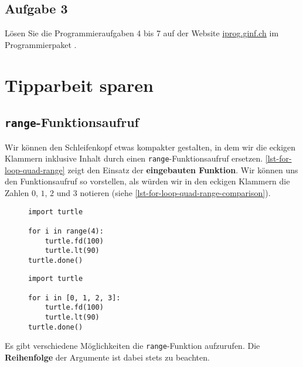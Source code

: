 \fillwithgrid{2in}

\subsection{Aufgabe 3}

Lösen Sie die Programmieraufgaben 4 bis 7 auf der Website \url{iprog.ginf.ch} im Programmierpaket .

\section{Tipparbeit sparen}

\subsection{\lstinline{range}-Funktionsaufruf}

Wir können den Schleifenkopf etwas kompakter gestalten, in dem wir die eckigen Klammern inklusive Inhalt durch einen \lstinline{range}-Funktionsaufruf ersetzen. \autoref{lst-for-loop-quad-range} zeigt den Einsatz der \textbf{eingebauten Funktion}. Wir können uns den Funktionsaufruf so vorstellen, als würden wir in den eckigen Klammern die Zahlen $0$, $1$, $2$ und $3$ notieren (siehe \autoref{lst-for-loop-quad-range-comparison}).

\begin{figure}[htb]
\centering
\begin{minipage}{0.45\textwidth}
\centering
	\begin{lstlisting}[caption={Erste Verbesserung.}, label={lst-for-loop-quad-range}]
import turtle

for i in range(4):
    turtle.fd(100)
    turtle.lt(90)
turtle.done()
\end{lstlisting}
\end{minipage}
\hfill
\begin{minipage}{0.45\textwidth}
\centering
\begin{lstlisting}[caption={Eingangsbeispiel}, label={lst-for-loop-quad-range-comparison}]
import turtle

for i in [0, 1, 2, 3]:
    turtle.fd(100)
    turtle.lt(90)
turtle.done()
\end{lstlisting}
\end{minipage}
\end{figure}

\vspace{-0.25cm}

Es gibt verschiedene Möglichkeiten die \lstinline{range}-Funktion aufzurufen. Die \textbf{Reihenfolge} der Argumente ist dabei stets zu beachten.

